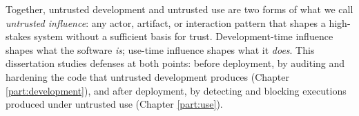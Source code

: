 Together, untrusted development and untrusted use are two forms of what
we call \emph{untrusted influence}: any actor, artifact, or interaction pattern
that shapes a high-stakes system without a sufficient basis for trust.
Development-time influence shapes what the software \emph{is}; use-time influence
shapes what it \emph{does}. 
This dissertation studies defenses at both points:
before deployment, by auditing and hardening the code that untrusted development
produces (Chapter \ref{part:development}), and after deployment, by detecting and blocking executions produced
under untrusted use (Chapter \ref{part:use}).
